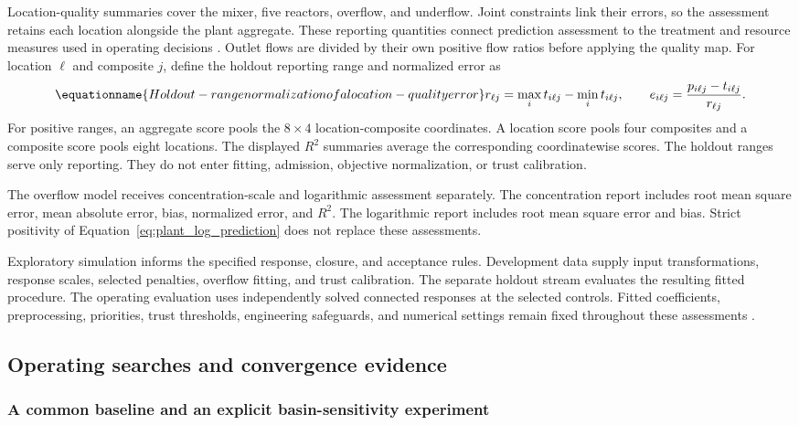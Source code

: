 Location-quality summaries cover the mixer, five reactors, overflow, and underflow. Joint constraints link their errors, so the assessment retains each location alongside the plant aggregate. These reporting quantities connect prediction assessment to the treatment and resource measures used in operating decisions \citep{BhosekarIerapetritou2018,McBride2019}. Outlet flows are divided by their own positive flow ratios before applying the quality map. For location $\ell$ and composite $j$, define the holdout reporting range and normalized error as
\begin{equation}
\equationname{Holdout-range normalization of a location-quality error}
r_{\ell j}=\max_it_{i\ell j}-\min_it_{i\ell j},\qquad
e_{i\ell j}=\frac{p_{i\ell j}-t_{i\ell j}}{r_{\ell j}}.
\end{equation}
For positive ranges, an aggregate score pools the $8\times4$ location-composite coordinates. A location score pools four composites and a composite score pools eight locations. The displayed $R^2$ summaries average the corresponding coordinatewise scores. The holdout ranges serve only reporting. They do not enter fitting, admission, objective normalization, or trust calibration.

The overflow model receives concentration-scale and logarithmic assessment separately. The concentration report includes root mean square error, mean absolute error, bias, normalized error, and $R^2$. The logarithmic report includes root mean square error and bias. Strict positivity of Equation~\eqref{eq:plant_log_prediction} does not replace these assessments.

Exploratory simulation informs the specified response, closure, and acceptance rules. Development data supply input transformations, response scales, selected penalties, overflow fitting, and trust calibration. The separate holdout stream evaluates the resulting fitted procedure. The operating evaluation uses independently solved connected responses at the selected controls. Fitted coefficients, preprocessing, priorities, trust thresholds, engineering safeguards, and numerical settings remain fixed throughout these assessments \citep{Kaufman2012}.

\subsection{Operating searches and convergence evidence}

\subsubsection{A common baseline and an explicit basin-sensitivity experiment}

